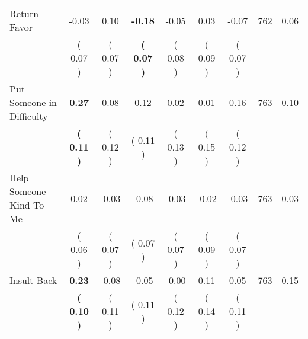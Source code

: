 \begin{tabular}{lcccccccc}
Return Favor &     -0.03 &      0.10 & \textbf{    -0.18} &     -0.05 &      0.03 &     -0.07 & 762 &       0.06 \\ 
 & (     0.07 ) & (     0.07 ) & \textbf{(     0.07 )} & (     0.08 ) & (     0.09 ) & (     0.07 ) & \\
Put Someone in Difficulty & \textbf{     0.27} &      0.08 &      0.12 &      0.02 &      0.01 &      0.16 & 763 &       0.10 \\ 
 & \textbf{(     0.11 )} & (     0.12 ) & (     0.11 ) & (     0.13 ) & (     0.15 ) & (     0.12 ) & \\
Help Someone Kind To Me &      0.02 &     -0.03 &     -0.08 &     -0.03 &     -0.02 &     -0.03 & 763 &       0.03 \\ 
 & (     0.06 ) & (     0.07 ) & (     0.07 ) & (     0.07 ) & (     0.09 ) & (     0.07 ) & \\
Insult Back & \textbf{     0.23} &     -0.08 &     -0.05 &     -0.00 &      0.11 &      0.05 & 763 &       0.15 \\ 
 & \textbf{(     0.10 )} & (     0.11 ) & (     0.11 ) & (     0.12 ) & (     0.14 ) & (     0.11 ) & \\
\bottomrule
\end{tabular}
